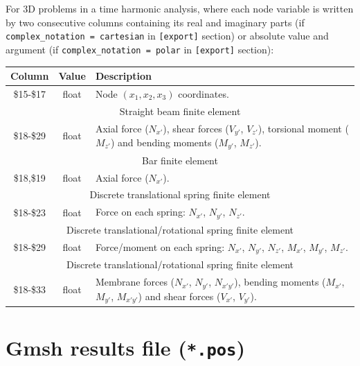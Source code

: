 \documentclass[a4paper,fleqn]{book}
\begin{document}
For 3D problems in a time harmonic analysis, where each node variable is written by two consecutive columns containing its real and imaginary parts (if \texttt{complex\_notation = cartesian} in \texttt{[export]} section) or absolute value and argument (if \texttt{complex\_notation = polar} in \texttt{[export]} section):
\begin{longtable}{ccp{11cm}}
\textbf{Column} & \textbf{Value} &\textbf{Description} \\ 
\endhead
\midrule
\$15-\$17 & float & Node $(x_1,x_2,x_3)$ coordinates. \\
\midrule
\multicolumn{3}{c}{Straight beam finite element} \\
\$18-\$29 & float & Axial force ($N_{x'}$), shear forces ($V_{y'}$, $V_{z'}$), torsional moment ($M_{z'}$) and bending moments ($M_{y'}$, $M_{z'}$). \\
\midrule
\multicolumn{3}{c}{Bar finite element} \\
\$18,\$19 & float & Axial force ($N_{x'}$). \\
\midrule
\multicolumn{3}{c}{Discrete translational spring finite element} \\
\$18-\$23 & float & Force on each spring: $N_{x'}$, $N_{y'}$, $N_{z'}$. \\
\midrule
\multicolumn{3}{c}{Discrete translational/rotational spring finite element} \\
\$18-\$29 & float & Force/moment on each spring: $N_{x'}$, $N_{y'}$, $N_{z'}$, $M_{x'}$, $M_{y'}$, $M_{z'}$. \\
\midrule
\multicolumn{3}{c}{Discrete translational/rotational spring finite element} \\
\$18-\$33 & float & Membrane forces ($N_{x'}$, $N_{y'}$, $N_{x'y'}$), bending moments ($M_{x'}$, $M_{y'}$, $M_{x'y'}$) and shear forces ($V_{x'}$, $V_{y'}$).
\end{longtable}


\section{Gmsh results file (\texttt{*.pos})}
\end{document}
